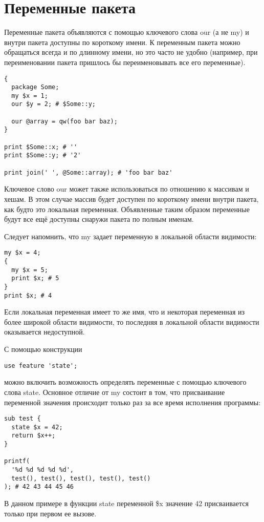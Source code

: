 \section{Переменные пакета}
Переменные пакета объявляются с помощью ключевого слова our (а не my) и внутри пакета доступны по короткому имени. К переменным пакета можно обращаться всегда и по длинному имени, но это часто не удобно (например, при переименовании пакета пришлось бы переименовывать все его переменные).
\begin{verbatim}
{
  package Some;
  my $x = 1;
  our $y = 2; # $Some::y;

  our @array = qw(foo bar baz);
}

print $Some::x; # ''
print $Some::y; # '2'

print join(' ', @Some::array); # 'foo bar baz'
\end{verbatim}
Ключевое слово our может также использоваться по отношению к массивам и хешам. В этом случае массив будет доступен по короткому имени внутри пакета, как будто это локальная переменная. Объявленные таким образом переменные будут все ещё доступны снаружи пакета по полным именам.

Следует напомнить, что my задает переменную в локальной области видимости:
\begin{verbatim}
my $x = 4;
{
  my $x = 5;
  print $x; # 5
}
print $x; # 4
\end{verbatim}
Если локальная переменная имеет то же имя, что и некоторая переменная из более широкой области видимости, то последняя в локальной области видимости оказывается недоступной.

С помощью конструкции
\begin{verbatim}
use feature 'state';
\end{verbatim}
можно включить возможность определять переменные с помощью ключевого слова state. Основное отличие от my состоит в том, что присваивание переменной значения происходит только раз за все время исполнения программы:
\begin{verbatim}
sub test {
  state $x = 42;
  return $x++;
}

printf(
  '%d %d %d %d %d',
  test(), test(), test(), test(), test()
); # 42 43 44 45 46
\end{verbatim}
В данном примере в функции state переменной \$x значение 42 присваивается только при первом ее вызове.

